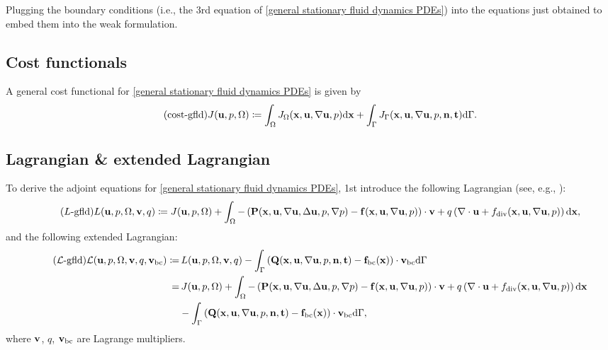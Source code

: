 \documentclass[oneside]{book}
\numberwithin{equation}{section}
\begin{document}
Plugging the boundary conditions (i.e., the 3rd equation of \eqref{general stationary fluid dynamics PDEs}) into the equations just obtained to embed them into the weak formulation.

\subsection{Cost functionals}
A general cost functional for \eqref{general stationary fluid dynamics PDEs} is given by
\begin{align}
    \label{cost functional of general stationary fluid dynamics PDEs}
    \tag{cost-gfld}
    J({\bf u},p,\Omega)\coloneqq\int_\Omega J_\Omega({\bf x},{\bf u},\nabla{\bf u},p){\rm d}{\bf x} + \int_\Gamma J_\Gamma({\bf x},{\bf u},\nabla{\bf u},p,{\bf n},{\bf t}){\rm d}\Gamma.
\end{align}

\subsection{Lagrangian \& extended Lagrangian}
To derive the adjoint equations for \eqref{general stationary fluid dynamics PDEs}, 1st introduce the following Lagrangian (see, e.g., \cite{Troltzsch2010}):
\begin{align}
    \label{Lagrangian for general stationary fluid dynamics PDEs}
    \tag{$L$-gfld}
    L({\bf u},p,\Omega,{\bf v},q)\coloneqq J({\bf u},p,\Omega) + \int_\Omega -\left({\bf P}({\bf x},{\bf u},\nabla{\bf u},\Delta{\bf u},p,\nabla p) - {\bf f}({\bf x},{\bf u},\nabla{\bf u},p)\right)\cdot{\bf v} + q\left(\nabla\cdot{\bf u} + f_{\rm div}({\bf x},{\bf u},\nabla{\bf u},p)\right){\rm d}{\bf x},
\end{align}
and the following extended Lagrangian:
\begin{align}
    \label{extended Lagrangian for general stationary fluid dynamics PDEs}
    \tag{$\mathcal{L}$-gfld}
    \mathcal{L}({\bf u},p,\Omega,{\bf v},q,{\bf v}_{\rm bc})\coloneqq&\, L({\bf u},p,\Omega,{\bf v},q)
    - \int_\Gamma \left({\bf Q}({\bf x},{\bf u},\nabla{\bf u},p,{\bf n},{\bf t}) - {\bf f}_{\rm bc}({\bf x})\right)\cdot{\bf v}_{\rm bc}{\rm d}\Gamma\\
    =&\, J({\bf u},p,\Omega) + \int_\Omega -\left({\bf P}({\bf x},{\bf u},\nabla{\bf u},\Delta{\bf u},p,\nabla p) - {\bf f}({\bf x},{\bf u},\nabla{\bf u},p)\right)\cdot{\bf v} + q\left(\nabla\cdot{\bf u} + f_{\rm div}({\bf x},{\bf u},\nabla{\bf u},p)\right){\rm d}{\bf x}\nonumber\\
    &- \int_\Gamma \left({\bf Q}({\bf x},{\bf u},\nabla{\bf u},p,{\bf n},{\bf t}) - {\bf f}_{\rm bc}({\bf x})\right)\cdot{\bf v}_{\rm bc}{\rm d}\Gamma,\nonumber
\end{align}
where ${\bf v}$, $q$, ${\bf v}_{\rm bc}$ are Lagrange multipliers.
\end{document}
